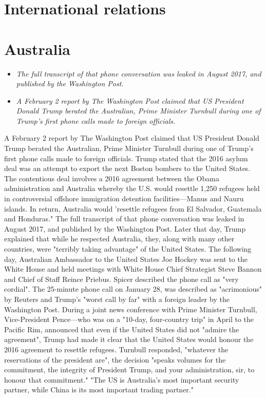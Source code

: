 \section{International relations}\label{international-relations}

\section{Australia}\label{australia}

\begin{itemize}
\item
  \emph{The full transcript of that phone conversation was leaked in
  August 2017, and published by the Washington Post.}
\item
  \emph{A February 2 report by The Washington Post claimed that US
  President Donald Trump berated the Australian, Prime Minister Turnbull
  during one of Trump's first phone calls made to foreign officials.}
\end{itemize}

A February 2 report by The Washington Post claimed that US President
Donald Trump berated the Australian, Prime Minister Turnbull during one
of Trump's first phone calls made to foreign officials. Trump stated
that the 2016 asylum deal was an attempt to export the next Boston
bombers to the United States. The contentious deal involves a 2016
agreement between the Obama administration and Australia whereby the
U.S. would resettle 1,250 refugees held in controversial offshore
immigration detention facilities---Manus and Nauru islands. In return,
Australia would 'resettle refugees from El Salvador, Guatemala and
Honduras." The full transcript of that phone conversation was leaked in
August 2017, and published by the Washington Post. Later that day, Trump
explained that while he respected Australia, they, along with many other
countries, were "terribly taking advantage" of the United States. The
following day, Australian Ambassador to the United States Joe Hockey was
sent to the White House and held meetings with White House Chief
Strategist Steve Bannon and Chief of Staff Reince Priebus. Spicer
described the phone call as "very cordial". The 25-minute phone call on
January 28, was described as "acrimonious" by Reuters and Trump's "worst
call by far" with a foreign leader by the Washington Post. During a
joint news conference with Prime Minister Turnbull, Vice-President
Pence---who was on a "10-day, four-country trip" in April to the Pacific
Rim, announced that even if the United States did not "admire the
agreement", Trump had made it clear that the United States would honour
the 2016 agreement to resettle refugees. Turnbull responded, "whatever
the reservations of the president are", the decision "speaks volumes for
the commitment, the integrity of President Trump, and your
administration, sir, to honour that commitment." "The US is Australia's
most important security partner, while China is its most important
trading partner."

